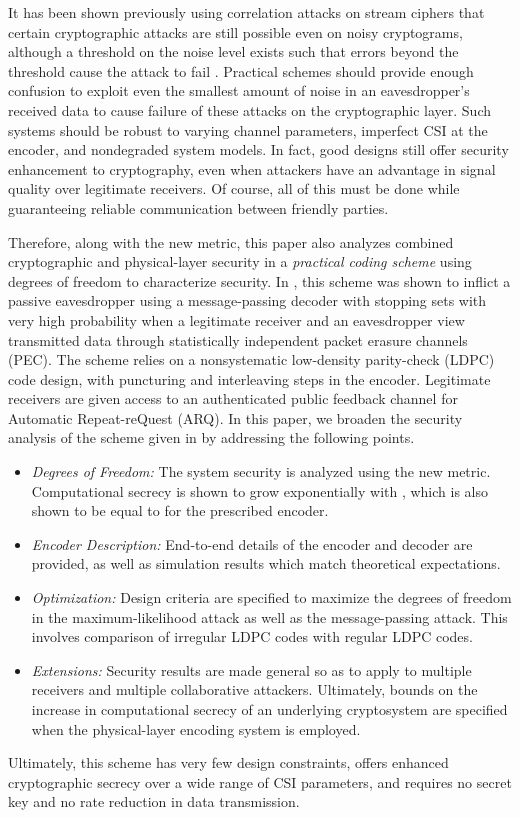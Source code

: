 \documentclass[10pt,twocolumn,twoside]{IEEEtran} \newlength{\pic}
\theoremstyle{definition}
\theoremstyle{remark}
\theoremstyle{plain}
\begin{document}
It has been shown previously using correlation attacks on stream ciphers that certain cryptographic attacks are still possible even on noisy cryptograms, although a threshold on the noise level exists such that errors beyond the threshold cause the attack to fail \cite{Meier89, Harrison09_ICC, Harrison09_ISIT, Harrison09_ITW}. Practical schemes should provide enough confusion to exploit even the smallest amount of noise in an eavesdropper's received data to cause failure of these attacks on the cryptographic layer. Such systems should be robust to varying channel parameters, imperfect CSI at the encoder, and nondegraded system models. In fact, good designs still offer security enhancement to cryptography, even when attackers have an advantage in signal quality over legitimate receivers. Of course, all of this must be done while guaranteeing reliable communication between friendly parties.

Therefore, along with the new metric, this paper also analyzes combined cryptographic and physical-layer security in a \emph{practical coding scheme} using degrees of freedom to characterize security. In \cite{Harrison10_ITW}, this scheme was shown to inflict a passive eavesdropper using a message-passing decoder with stopping sets with very high probability when a legitimate receiver and an eavesdropper view transmitted data through statistically independent packet erasure channels (PEC). The scheme relies on a nonsystematic low-density parity-check (LDPC) code design, with puncturing and interleaving steps in the encoder. Legitimate receivers are given access to an authenticated public feedback channel for Automatic Repeat-reQuest (ARQ). In this paper, we broaden the security analysis of the scheme given in \cite{Harrison10_ITW} by addressing the following points.
\begin{itemize}
  \item \emph{Degrees of Freedom:} The system security is analyzed using the new metric. Computational secrecy is shown to grow exponentially with , which is also shown to be equal to  for the prescribed encoder.
  \item \emph{Encoder Description:} End-to-end details of the encoder and decoder are provided, as well as simulation results which match theoretical expectations.
  \item \emph{Optimization:} Design criteria are specified to maximize the degrees of freedom in the maximum-likelihood attack as well as the message-passing attack. This involves comparison of irregular LDPC codes with regular LDPC codes.
  \item \emph{Extensions:} Security results are made general so as to apply to multiple receivers and multiple collaborative attackers. Ultimately, bounds on the increase in computational secrecy of an underlying cryptosystem are specified when the physical-layer encoding system is employed.
\end{itemize}
Ultimately, this scheme has very few design constraints, offers enhanced cryptographic secrecy over a wide range of CSI parameters, and requires no secret key and no rate reduction in data transmission.
\end{document}
